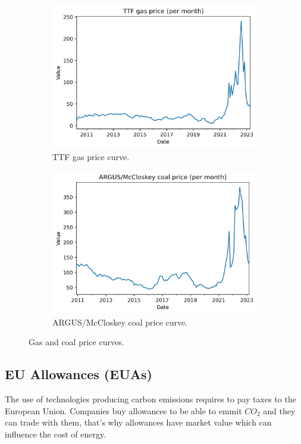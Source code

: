 \begin{figure}[H]
\centering
    \begin{subfigure}{.45\textwidth}
        \centering
        \includegraphics[width=1\linewidth]{images/variable_analysis/ttf_m_all}
        \caption{TTF gas price curve.}
    \end{subfigure}
    \begin{subfigure}{.45\textwidth}
        \centering
        \includegraphics[width=1\linewidth]{images/variable_analysis/coal_m_all}
        \caption{ARGUS/McCloskey coal price curve.}
    \end{subfigure}

    \caption{Gas and coal price curves.}
    \label{fig:commodities-series}
\end{figure}

\subsection{EU Allowances (EUAs)}
The use of technologies producing carbon emissions requires to pay taxes to the European Union.
Companies buy allowances to be able to emmit $CO_2$ and they can trade with them, that's why allowances have market value which can influence the cost of energy.

